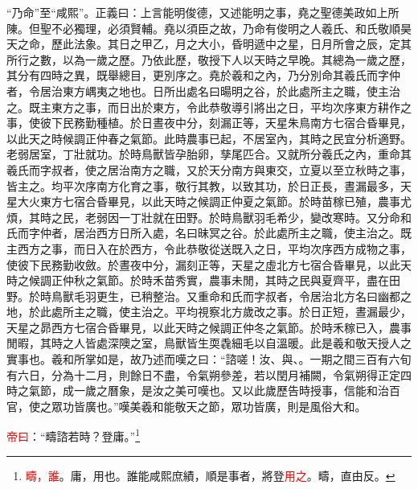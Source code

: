 {\noindent\shu{}\fzkt “乃命”至“咸熙”。正義曰：上言能明俊德，又述能明之事，堯之聖德美政如上所陳。但聖不必獨理，必須賢輔。堯以須臣之故，乃命有俊明之人羲氏、和氏敬順昊天之命，歷此法象。其日之甲乙，月之大小，昏明遞中之星，日月所會之辰，定其所行之數，以為一歲之歷。乃依此歷，敬授下人以天時之早晚。其總為一歲之歷，其分有四時之異，既舉總目，更別序之。堯於羲和之內，乃分別命其羲氏而字仲者，令居治東方嵎夷之地也。日所出處名曰暘明之谷，於此處所主之職，使主治之。既主東方之事，而日出於東方，令此恭敬導引將出之日，平均次序東方耕作之事，使彼下民務勤種植。於日晝夜中分，刻漏正等，天星朱鳥南方七宿合昏畢見，以此天之時候調正仲春之氣節。此時農事已起，不居室內，其時之民宜分析適野。老弱居室，丁壯就功。於時鳥獸皆孕胎卵，孳尾匹合。又就所分羲氏之內，重命其羲氏而字叔者，使之居治南方之職，又於天分南方與東交，立夏以至立秋時之事，皆主之。均平次序南方化育之事，敬行其教，以致其功，於日正長，晝漏最多，天星大火東方七宿合昏畢見，以此天時之候調正仲夏之氣節。於時苗稼已殖，農事尤煩，其時之民，老弱因一丁壯就在田野。於時鳥獸羽毛希少，變改寒時。又分命和氏而字仲者，居治西方日所入處，名曰昧冥之谷。於此處所主之職，使主治之。既主西方之事，而日入在於西方，令此恭敬從送既入之日，平均次序西方成物之事，使彼下民務勤收斂。於晝夜中分，漏刻正等，天星之虛北方七宿合昏畢見，以此天時之候調正仲秋之氣節。於時禾苗秀實，農事未閒，其時之民與夏齊平，盡在田野。於時鳥獸毛羽更生，已稍整治。又重命和氏而字叔者，令居治北方名曰幽都之地，於此處所主之職，使主治之。平均視察北方歲改之事。於日正短，晝漏最少，天星之昴西方七宿合昏畢見，以此天時之候調正仲冬之氣節。於時禾稼已入，農事閒暇，其時之人皆處深隩之室，鳥獸皆生耎毳細毛以自溫暖。此是羲和敬天授人之實事也。羲和所掌如是，故乃述而嘆之曰：“諮嗟！汝、與、。一期之間三百有六旬有六日，分為十二月，則餘日不盡，令氣朔參差，若以閏月補闕，令氣朔得正定四時之氣節，成一歲之曆象，是汝之美可嘆也。又以此歲歷告時授事，信能和治百官，使之眾功皆廣也。”嘆美羲和能敬天之節，眾功皆廣，則是風俗大和。 \par}

\textcolor{red}{帝曰}：“疇諮若時？登庸。”\footnote{\textcolor{red}{疇，誰}。庸，用也。誰能咸熙庶績，順是事者，將登\textcolor{red}{用之}。疇，直由反。}

